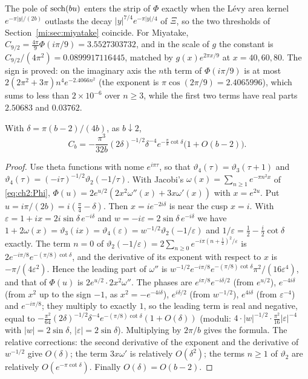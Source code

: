 The pole of $\operatorname{sech}(bu)$ enters the strip of $\Phi$ exactly when the L\'evy area kernel $e^{-\pi|y|/(2b)}$ outlasts the decay $|y|^{7/4}e^{-\pi|y|/4}$ of $\Xi$, so the two thresholds of Section~\ref{mi:sec:miyatake} coincide. For Miyatake, $C_{9/2}=\frac{4\pi}9\Phi(i\pi/9)=3.5527303732$, and in the scale of $g$ the constant is $C_{9/2}/(4\pi^2)=0.0899917116445$, matched by $g(x)e^{2\pi x/9}$ at $x=40,60,80$. The sign is proved: on the imaginary axis the $n$th term of $\Phi(i\pi/9)$ is at most $2(2\pi^2+3\pi)n^4e^{-2.4066n^2}$ (the exponent is $\pi\cos(2\pi/9)=2.4065996$), which sums to less than $2\times10^{-6}$ over $n\ge3$, while the first two terms have real parts $2.50683$ and $0.03762$.

\begin{theorem}\label{mi:thm:cusp}
With $\delta=\pi(b-2)/(4b)$, as $b\downarrow2$,
\[
C_b=-\frac{\pi^3}{32b}(2\delta)^{-1/2}\delta^{-4}e^{-\frac\pi8\cot\delta}\big(1+O(b-2)\big).
\]
\end{theorem}

\begin{proof}
Use theta functions with nome $e^{i\pi\tau}$, so that $\vartheta_4(\tau)=\vartheta_3(\tau+1)$ and $\vartheta_4(\tau)=(-i\tau)^{-1/2}\vartheta_2(-1/\tau)$. With Jacobi's $\omega(x)=\sum_{n\ge1}e^{-\pi n^2x}$ of \eqref{eq:ch2:Phi}, $\Phi(u)=2e^{u/2}(2x^2\omega''(x)+3x\omega'(x))$ with $x=e^{2u}$. Put $u=i\pi/(2b)=i(\frac\pi4-\delta)$. Then $x=ie^{-2i\delta}$ is near the cusp $x=i$. With $\varepsilon=1+ix=2i\sin\delta\,e^{-i\delta}$ and $w=-i\varepsilon=2\sin\delta\,e^{-i\delta}$ we have $1+2\omega(x)=\vartheta_3(ix)=\vartheta_4(\varepsilon)=w^{-1/2}\vartheta_2(-1/\varepsilon)$ and $1/\varepsilon=\frac12-\frac i2\cot\delta$ exactly. The term $n=0$ of $\vartheta_2(-1/\varepsilon)=2\sum_{n\ge0}e^{-i\pi(n+\frac12)^2/\varepsilon}$ is $2e^{-i\pi/8}e^{-(\pi/8)\cot\delta}$, and the derivative of its exponent with respect to $x$ is $-\pi/(4\varepsilon^2)$. Hence the leading part of $\omega''$ is $w^{-1/2}e^{-i\pi/8}e^{-(\pi/8)\cot\delta}\pi^2/(16\varepsilon^4)$, and that of $\Phi(u)$ is $2e^{u/2}\cdot2x^2\omega''$. The phases are $e^{i\pi/8}e^{-i\delta/2}$ (from $e^{u/2}$), $e^{-4i\delta}$ (from $x^2$ up to the sign $-1$, as $x^2=-e^{-4i\delta}$), $e^{i\delta/2}$ (from $w^{-1/2}$), $e^{4i\delta}$ (from $\varepsilon^{-4}$) and $e^{-i\pi/8}$; they multiply to exactly $1$, so the leading term is real and negative, equal to $-\frac{\pi^2}{64}(2\delta)^{-1/2}\delta^{-4}e^{-(\pi/8)\cot\delta}(1+O(\delta))$ (moduli: $4\cdot|w|^{-1/2}\cdot\frac{\pi^2}{16}|\varepsilon|^{-4}$ with $|w|=2\sin\delta$, $|\varepsilon|=2\sin\delta$). Multiplying by $2\pi/b$ gives the formula. The relative corrections: the second derivative of the exponent and the derivative of $w^{-1/2}$ give $O(\delta)$; the term $3x\omega'$ is relatively $O(\delta^2)$; the terms $n\ge1$ of $\vartheta_2$ are relatively $O(e^{-\pi\cot\delta})$. Finally $O(\delta)=O(b-2)$.
\end{proof}

